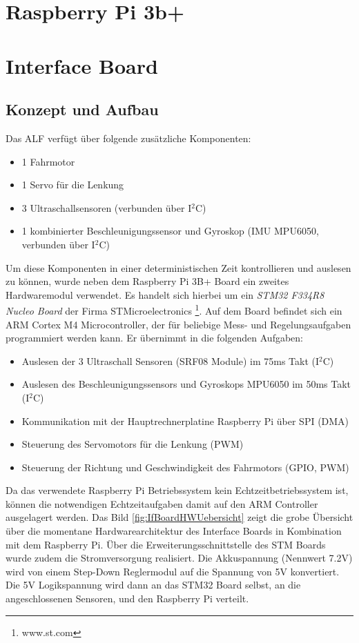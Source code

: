 \section{Raspberry Pi 3b+}


\newpage
\section{Interface Board}
\label{sec:InterfaceBoard}
\subsection{Konzept und Aufbau}
Das ALF verfügt über folgende zusätzliche Komponenten:
\begin{itemize}
\item 1 Fahrmotor
\item 1 Servo für die Lenkung
\item 3 Ultraschallsensoren (verbunden über I$^{2}$C)
\item 1 kombinierter Beschleunigungssensor und Gyroskop (IMU MPU6050, verbunden über I$^{2}$C)
\end{itemize}

Um diese Komponenten in einer deterministischen Zeit kontrollieren und auslesen zu können, wurde neben dem Raspberry Pi 3B+ Board ein zweites Hardwaremodul verwendet. Es handelt sich hierbei um ein \textit{STM32 F334R8 Nucleo Board} der Firma STMicroelectronics \footnote{www.st.com}. Auf dem Board befindet sich ein ARM Cortex M4 Microcontroller, der für beliebige Mess- und Regelungsaufgaben programmiert werden kann. Er übernimmt in die folgenden Aufgaben:
\begin{itemize}
\item Auslesen der 3 Ultraschall Sensoren (SRF08 Module) im 75ms Takt (I$^{2}$C)
\item Auslesen des Beschleunigungssensors und Gyroskops MPU6050 im 50ms Takt (I$^{2}$C)
\item Kommunikation mit der Hauptrechnerplatine Raspberry Pi über SPI (DMA)
\item Steuerung des Servomotors für die Lenkung (PWM)
\item Steuerung der Richtung und Geschwindigkeit des Fahrmotors (GPIO, PWM)
\end{itemize}
Da das verwendete Raspberry Pi Betriebssystem kein Echtzeitbetriebssystem ist, können die notwendigen Echtzeitaufgaben damit auf den ARM Controller ausgelagert werden. Das Bild \ref{fig:IfBoardHWUebersicht} zeigt die grobe Übersicht über die momentane Hardwarearchitektur des Interface Boards in Kombination mit dem Raspberry Pi. Über die Erweiterungsschnittstelle des STM Boards wurde zudem die Stromversorgung realisiert. Die Akkuspannung (Nennwert 7.2V) wird von einem Step-Down Reglermodul auf die Spannung von 5V konvertiert. Die 5V Logikspannung wird dann an das STM32 Board selbst, an die angeschlossenen Sensoren, und den Raspberry Pi verteilt.

